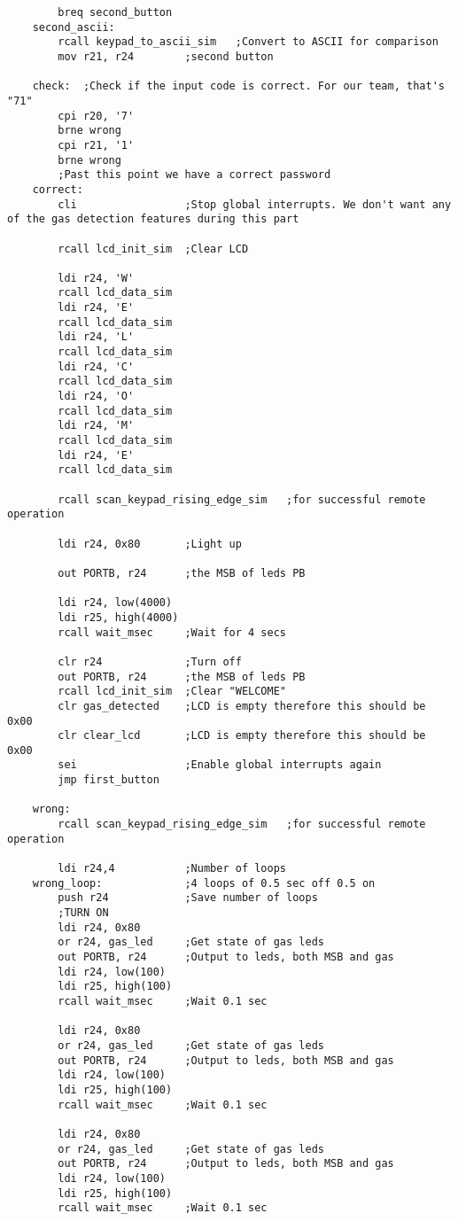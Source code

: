 \documentclass{article}
\begin{document}
\begin{verbatim}
		breq second_button
    second_ascii:
		rcall keypad_to_ascii_sim	;Convert to ASCII for comparison
		mov r21, r24		;second button

	check:	;Check if the input code is correct. For our team, that's "71"
		cpi r20, '7'
		brne wrong
        cpi r21, '1'
        brne wrong
		;Past this point we have a correct password
	correct:
		cli					;Stop global interrupts. We don't want any of the gas detection features during this part

        rcall lcd_init_sim	;Clear LCD

        ldi r24, 'W'
        rcall lcd_data_sim
        ldi r24, 'E'
        rcall lcd_data_sim
        ldi r24, 'L'
        rcall lcd_data_sim
        ldi r24, 'C'
        rcall lcd_data_sim
        ldi r24, 'O'
        rcall lcd_data_sim
        ldi r24, 'M'
        rcall lcd_data_sim
        ldi r24, 'E'
        rcall lcd_data_sim

        rcall scan_keypad_rising_edge_sim   ;for successful remote operation

		ldi r24, 0x80		;Light up
			
		out PORTB, r24		;the MSB of leds PB
			
		ldi r24, low(4000)
		ldi r25, high(4000)
		rcall wait_msec		;Wait for 4 secs

		clr r24				;Turn off
		out PORTB, r24		;the MSB of leds PB
		rcall lcd_init_sim	;Clear "WELCOME"
		clr gas_detected	;LCD is empty therefore this should be 0x00
		clr clear_lcd		;LCD is empty therefore this should be 0x00
		sei					;Enable global interrupts again
		jmp first_button
		
	wrong:
        rcall scan_keypad_rising_edge_sim   ;for successful remote operation

		ldi r24,4			;Number of loops
    wrong_loop:				;4 loops of 0.5 sec off 0.5 on
		push r24			;Save number of loops
		;TURN ON
		ldi r24, 0x80
		or r24, gas_led		;Get state of gas leds
		out PORTB, r24		;Output to leds, both MSB and gas
		ldi r24, low(100)
		ldi r25, high(100)
		rcall wait_msec		;Wait 0.1 sec

		ldi r24, 0x80
		or r24, gas_led		;Get state of gas leds
		out PORTB, r24		;Output to leds, both MSB and gas
		ldi r24, low(100)
		ldi r25, high(100)
		rcall wait_msec		;Wait 0.1 sec

		ldi r24, 0x80
		or r24, gas_led		;Get state of gas leds
		out PORTB, r24		;Output to leds, both MSB and gas
		ldi r24, low(100)
		ldi r25, high(100)
		rcall wait_msec		;Wait 0.1 sec


\end{verbatim}
\end{document}
